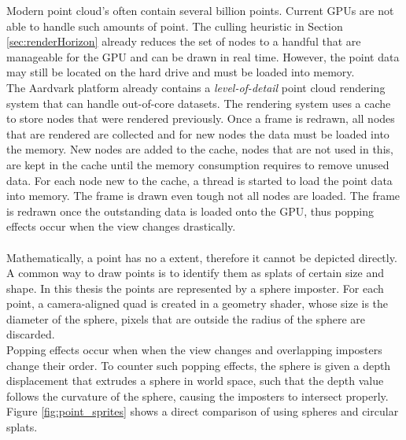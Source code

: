 Modern point cloud's often contain several billion points. Current GPUs are not able to handle such amounts of point. The culling heuristic in Section \ref{sec:renderHorizon} already reduces the set of nodes to a handful that are manageable for the GPU and can be drawn in real time. However, the point data may still be located on the hard drive and must be loaded into memory. 
\\
The Aardvark platform already contains a \textit{level-of-detail} point cloud rendering system that can handle out-of-core datasets. The rendering system uses a cache to store nodes that were rendered previously. Once a frame is redrawn, all nodes that are rendered are collected and for new nodes the data must be loaded into the memory. New nodes are added to the cache, nodes that are not used in this, are kept in the cache until the memory consumption requires to remove unused data. For each node new to the cache, a thread is started to load the point data into memory. The frame is drawn even tough not all nodes are loaded. The frame is redrawn once the outstanding data is loaded onto the GPU, thus popping effects occur when the view changes drastically. 
\\
\\
Mathematically, a point has no a extent, therefore it cannot be depicted directly. A common way to draw points is to identify them as splats of certain size and shape. In this thesis the points are represented by a sphere imposter. For each point, a camera-aligned quad is created in a geometry shader, whose size is the diameter of the sphere, pixels that are outside the radius of the sphere are discarded. 
\\
Popping effects occur when when the view changes and overlapping imposters change their order. To counter such popping effects, the sphere is given a depth displacement that extrudes a sphere in world space, such that the depth value follows the curvature of the sphere, causing the imposters to intersect properly. Figure \ref{fig:point_sprites} shows a direct comparison of using spheres and circular splats. 


